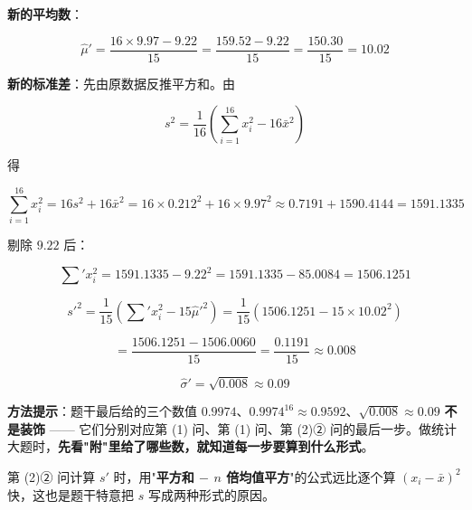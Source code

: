 \begin{answer}
\textbf{新的平均数}：

\nopagebreak[4]
\[\hat\mu'=\frac{16\times9.97-9.22}{15}=\frac{159.52-9.22}{15}=\frac{150.30}{15}=10.02\]

\textbf{新的标准差}：先由原数据反推平方和。由

\nopagebreak[4]
\[s^{2}=\frac1{16}\left(\sum_{i=1}^{16}x_i^{2}-16\bar x^{2}\right)\]

得

\nopagebreak[4]
\[\sum_{i=1}^{16}x_i^{2}=16s^{2}+16\bar x^{2}=16\times0.212^{2}+16\times9.97^{2}\approx0.7191+1590.4144=1591.1335\]

剔除 $9.22$ 后：

\nopagebreak[4]
\[\sum'x_i^{2}=1591.1335-9.22^{2}=1591.1335-85.0084=1506.1251\]

\nopagebreak[4]
\[s'^{2}=\frac1{15}\left(\sum'x_i^{2}-15\hat\mu'^{2}\right)=\frac1{15}\left(1506.1251-15\times10.02^{2}\right)\]

\nopagebreak[4]
\[=\frac{1506.1251-1506.0060}{15}=\frac{0.1191}{15}\approx0.008\]

\nopagebreak[4]
\[\hat\sigma'=\sqrt{0.008}\approx0.09\]

\begin{gktip}
\textbf{方法提示}：题干最后给的三个数值 $0.9974$、$0.9974^{16}\approx0.9592$、$\sqrt{0.008}\approx0.09$ \textbf{不是装饰} —— 它们分别对应第 (1) 问、第 (1) 问、第 (2)② 问的最后一步。做统计大题时，\textbf{先看"附"里给了哪些数，就知道每一步要算到什么形式}。

第 (2)② 问计算 $s'$ 时，用"\textbf{平方和 $-$ $n$ 倍均值平方}"的公式远比逐个算 $\left(x_i-\bar x\right)^{2}$ 快，这也是题干特意把 $s$ 写成两种形式的原因。
\end{gktip}



\par\medskip

\end{answer}
